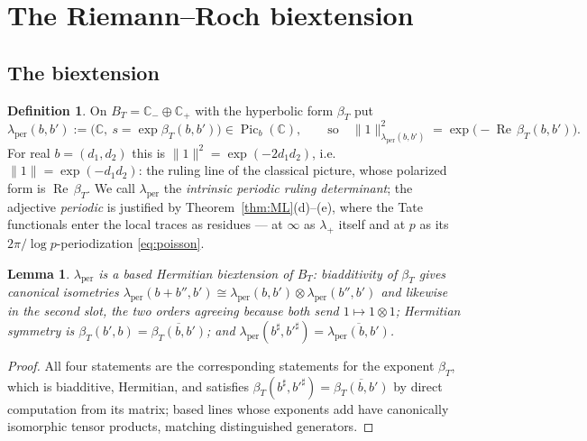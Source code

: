 \documentclass[11pt]{amsart}
\newtheorem{lemma}[theorem]{Lemma}
\theoremstyle{definition}
\newtheorem{definition}[theorem]{Definition}
\theoremstyle{remark}
\newcommand{\C}{\mathbb C}
\newcommand{\Rel}{\operatorname{Re}}
\newcommand{\Picb}{\operatorname{Pic}_{b}}
\newcommand{\BT}{B_T}
\begin{document}
\section{The Riemann--Roch biextension}\label{sec:RR}

\subsection{The biextension}

\begin{definition}\label{def:lper}
On $\BT=\C_-\oplus\C_+$ with the hyperbolic form $\beta_T$ put
\begin{equation}\label{eq:lper}
\lambda_{\mathrm{per}}(b,b'):=\bigl(\C,\ s=\exp\beta_T(b,b')\bigr)
\in\Picb(\C),\qquad\text{so}\quad
\lVert1\rVert^{2}_{\lambda_{\mathrm{per}}(b,b')}=
\exp\bigl(-\Rel\,\beta_T(b,b')\bigr).
\end{equation}
For real $b=(d_1,d_2)$ this is $\lVert1\rVert^{2}=\exp(-2d_1d_2)$, i.e.\
$\lVert1\rVert=\exp(-d_1d_2)$: the ruling line of the classical picture, whose
polarized form is $\Rel\,\beta_T$.  We call $\lambda_{\mathrm{per}}$ the
\emph{intrinsic periodic ruling determinant}; the adjective \emph{periodic} is
justified by Theorem~\ref{thm:ML}(d)--(e), where the Tate functionals enter the
local traces as residues --- at $\infty$ as $\lambda_+$ itself and at $p$ as
its $2\pi/\log p$-periodization \eqref{eq:poisson}.
\end{definition}

\begin{lemma}\label{lem:lperbiext}
$\lambda_{\mathrm{per}}$ is a based Hermitian biextension of $\BT$: biadditivity
of $\beta_T$ gives canonical isometries
$\lambda_{\mathrm{per}}(b+b'',b')\cong\lambda_{\mathrm{per}}(b,b')\otimes
\lambda_{\mathrm{per}}(b'',b')$ and likewise in the second slot, the two orders
agreeing because both send $1\mapsto1\otimes1$; Hermitian symmetry is
$\beta_T(b',b)=\overline{\beta_T(b,b')}$; and
$\lambda_{\mathrm{per}}(b^{\sharp},b'^{\sharp})=
\overline{\lambda_{\mathrm{per}}(b,b')}$.
\end{lemma}

\begin{proof}
All four statements are the corresponding statements for the exponent
$\beta_T$, which is biadditive, Hermitian, and satisfies
$\beta_T(b^{\sharp},b'^{\sharp})=\overline{\beta_T(b,b')}$ by direct
computation from its matrix; based lines whose exponents add have canonically
isomorphic tensor products, matching distinguished generators.
\end{proof}
\end{document}
